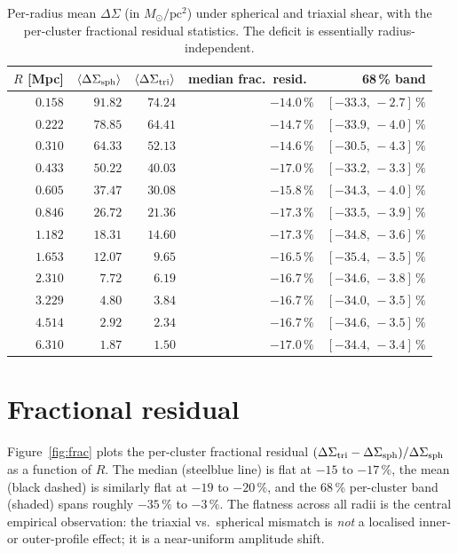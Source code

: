 \documentclass[11pt,a4paper]{article}
\newcommand{\DS}{\Delta\Sigma}
\begin{document}
\begin{table}[htbp]
  \centering
  \small
  \begin{tabular}{rrrrr}
    \toprule
    $R$ [Mpc] & $\langle\DS_{\rm sph}\rangle$ & $\langle\DS_{\rm tri}\rangle$
              & median frac.\ resid.\ & 68\,\% band\\
    \midrule
    $0.158$ & $91.82$ & $74.24$ & $-14.0\,\%$ & $[-33.3,\,-2.7]\,\%$\\
    $0.222$ & $78.85$ & $64.41$ & $-14.7\,\%$ & $[-33.9,\,-4.0]\,\%$\\
    $0.310$ & $64.33$ & $52.13$ & $-14.6\,\%$ & $[-30.5,\,-4.3]\,\%$\\
    $0.433$ & $50.22$ & $40.03$ & $-17.0\,\%$ & $[-33.2,\,-3.3]\,\%$\\
    $0.605$ & $37.47$ & $30.08$ & $-15.8\,\%$ & $[-34.3,\,-4.0]\,\%$\\
    $0.846$ & $26.72$ & $21.36$ & $-17.3\,\%$ & $[-33.5,\,-3.9]\,\%$\\
    $1.182$ & $18.31$ & $14.60$ & $-17.3\,\%$ & $[-34.8,\,-3.6]\,\%$\\
    $1.653$ & $12.07$ & $\phantom{0}9.65$ & $-16.5\,\%$ & $[-35.4,\,-3.5]\,\%$\\
    $2.310$ & $\phantom{0}7.72$ & $\phantom{0}6.19$ & $-16.7\,\%$ & $[-34.6,\,-3.8]\,\%$\\
    $3.229$ & $\phantom{0}4.80$ & $\phantom{0}3.84$ & $-16.7\,\%$ & $[-34.0,\,-3.5]\,\%$\\
    $4.514$ & $\phantom{0}2.92$ & $\phantom{0}2.34$ & $-16.7\,\%$ & $[-34.6,\,-3.5]\,\%$\\
    $6.310$ & $\phantom{0}1.87$ & $\phantom{0}1.50$ & $-17.0\,\%$ & $[-34.4,\,-3.4]\,\%$\\
    \bottomrule
  \end{tabular}
  \caption{Per-radius mean $\DS$ (in $M_\odot/\mathrm{pc}^2$) under spherical
  and triaxial shear, with the per-cluster fractional residual statistics.
  The deficit is essentially radius-independent.}
  \label{tab:perR}
\end{table}

\section{Fractional residual}

Figure~\ref{fig:frac} plots the per-cluster fractional residual
$(\DS_{\rm tri}-\DS_{\rm sph})/\DS_{\rm sph}$ as a function of $R$.  The
median (steelblue line) is flat at $-15$ to $-17\,\%$, the mean (black
dashed) is similarly flat at $-19$ to $-20\,\%$, and the 68\,\% per-cluster
band (shaded) spans roughly $-35\,\%$ to $-3\,\%$.  The flatness across all
radii is the central empirical observation: the triaxial vs.\ spherical
mismatch is \emph{not} a localised inner- or outer-profile effect; it is
a near-uniform amplitude shift.
\end{document}
